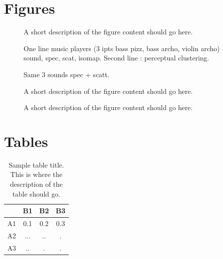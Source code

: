 \documentclass{bmcart}
\begin{document}
\begin{backmatter}

\section*{Figures}

\begin{figure}[h!]
\caption{
A short description of the figure content should go here.}
\end{figure}

\begin{figure}[h!]
\caption{
One line music players (3 ipts bass pizz, bass archo, violin archo) sound, spec,
scat, isomap.
Second line : perceptual clustering.}
\end{figure}

\begin{figure}[h!]
\caption{
Same 3 sounds spec + scatt.}
\end{figure}

\begin{figure}[h!]
\caption{
A short description of the figure content should go here.}
\end{figure}

\begin{figure}[h!]
\caption{
A short description of the figure content should go here.}
\end{figure}


\section*{Tables}
\begin{table}[h!]
\caption{Sample table title. This is where the description of the table should go.}
      \begin{tabular}{cccc}
        \hline
           & B1  &B2   & B3\\ \hline
        A1 & 0.1 & 0.2 & 0.3\\
        A2 & ... & ..  & .\\
        A3 & ..  & .   & .\\ \hline
      \end{tabular}
\end{table}


\end{backmatter}
\end{document}
